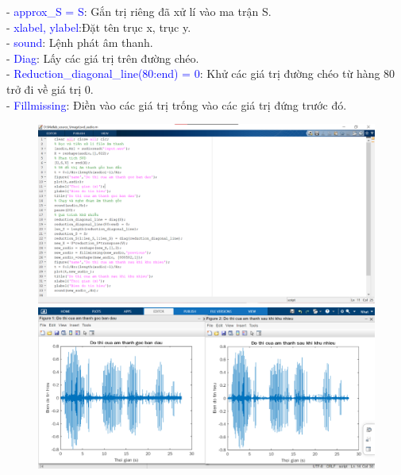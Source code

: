 - \textcolor{blue}{approx\_S = S}: Gắn trị riêng đã xử lí vào ma trận S.\\
- \textcolor{blue}{xlabel, ylabel}:Đặt tên trục x, trục y.\\
- \textcolor{blue}{sound}: Lệnh phát âm thanh.\\
- \textcolor{blue}{Diag}: Lấy các giá trị trên đường chéo.\\
- \textcolor{blue}{Reduction\_diagonal\_line(80:end) = 0}: Khử các giá trị đường chéo từ hàng 80 trở đi về giá trị 0. \\
- \textcolor{blue}{Fillmissing}: Điền vào các giá trị trống vào các giá trị đứng trước đó.\\



\begin{figure}[!ht]
	\begin{minipage}[b]{0.4\textwidth}
		\centering
		\includegraphics[scale=0.25]{code_}
	\end{minipage}
	
	\begin{minipage}[b]{0.4\textwidth}
		\centering
		\includegraphics[scale=0.25]{code_kq}
	\end{minipage}
\end{figure}\\










